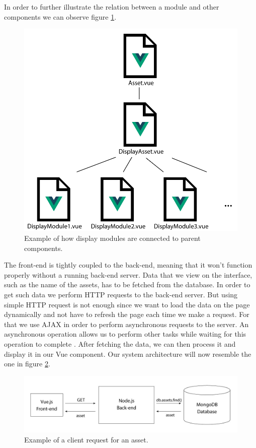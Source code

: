 In order to further illustrate the relation between a module and other components we can observe figure \ref{frontendStructure}.

\begin{figure}[h!]
    \centering
    \includegraphics[scale=0.23]{images/Frontend/frontendStructure.jpg}
    \caption[Front-end file structure]{Example of how display modules are connected to parent components.}
    \label{frontendStructure}
\end{figure}

The front-end is tightly coupled to the back-end, meaning that it won't function properly without a running back-end server. Data that we view on the interface, such as the name of the assets, has to be fetched from the database. In order to get such data we perform HTTP requests to the back-end server. But using simple HTTP request is not enough since we want to load the data on the page dynamically and not have to refresh the page each time we make a request. For that we use AJAX in order to perform asynchronous requests to the server. An asynchronous operation allows us to perform other tasks while waiting for this operation to complete \cite{Gyorodi2016WebAjax}. After fetching the data, we can then process it and display it in our Vue component. Our system architecture will now resemble the one in figure \ref{exampleGET}.

\begin{figure}[h!]
    \centering
    \includegraphics[scale=0.2]{images/Frontend/getAssetExample.jpg}
    \caption[Front-end request example]{Example of a client request for an asset.}
    \label{exampleGET}
\end{figure}


